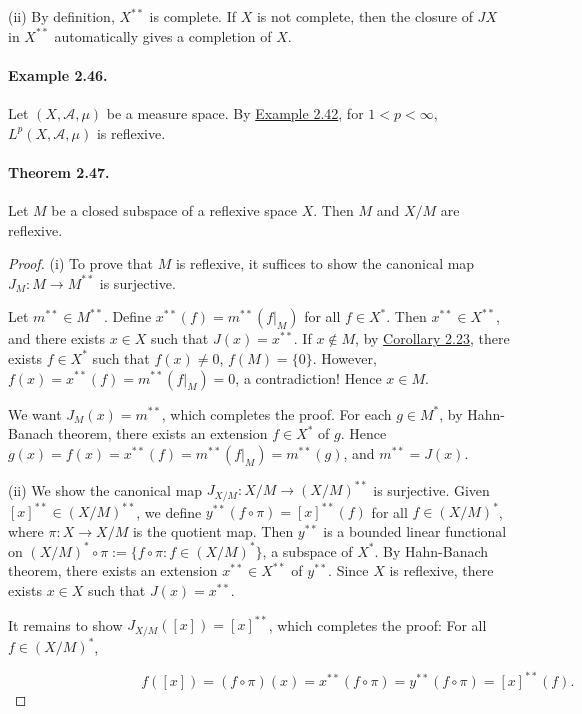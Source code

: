 \documentclass{article}
\begin{document}
(ii) By definition, $X^{**}$ is complete. If $X$ is not complete, then the closure of $JX$ in $X^{**}$ automatically gives a completion of $X$.

\paragraph{Example 2.46.\label{example:2.46}} Let $(X,\mathscr{A},\mu)$ be a measure space. By \hyperref[example:2.42]{Example 2.42}, for $1<p<\infty$, $L^p(X,\mathscr{A},\mu)$ is reflexive.

\paragraph{Theorem 2.47.\label{thm:2.47}} Let $M$ be a closed subspace of a reflexive space $X$. Then $M$ and $X/M$ are reflexive.
\begin{proof}
(i) To prove that $M$ is reflexive, it suffices to show the canonical map $J_M:M\to M^{**}$ is surjective.

Let $m^{**}\in M^{**}$. Define $x^{**}(f) = m^{**}(f|_M)$ for all $f\in X^*$. Then $x^{**}\in X^{**}$, and there exists $x\in X$ such that $J(x)=x^{**}$. If $x\notin M$, by \hyperref[cor:2.23]{Corollary 2.23}, there exists $f\in X^*$ such that $f(x)\neq 0$, $f(M)=\{0\}$. However, $f(x) = x^{**}(f) = m^{**}(f|_M) = 0$, a contradiction! Hence $x\in M$.

We want $J_M(x)=m^{**}$, which completes the proof. For each $g\in M^*$, by Hahn-Banach theorem, there exists an extension $f\in X^*$ of $g$. Hence $g(x) = f(x) = x^{**}(f) =  m^{**}(f|_M) = m^{**}(g)$, and $m^{**}=J(x)$. \vspace{0.1cm}

(ii) We show the canonical map $J_{X/M}:X/M\to(X/M)^{**}$ is surjective. Given $[x]^{**}\in (X/M)^{**}$, we define $y^{**}(f\circ\pi) = [x]^{**}(f)$ for all $f\in(X/M)^*$, where $\pi:X\to X/M$ is the quotient map. Then $y^{**}$ is a bounded linear functional on $(X/M)^*\circ\pi:=\{f\circ\pi:f\in(X/M)^*\}$, a subspace of $X^*$. By Hahn-Banach theorem, there exists an extension $x^{**}\in X^{**}$ of $y^{**}$. Since $X$ is reflexive, there exists $x\in X$ such that $J(x)=x^{**}$.

It remains to show $J_{X/M}([x])=[x]^{**}$, which completes the proof: For all $f\in (X/M)^{*}$, \vspace{0.3cm}

$\hspace{4cm} f([x]) = (f\circ\pi)(x) = x^{**}(f\circ\pi) = y^{**}(f\circ\pi) = [x]^{**}(f).$
\end{proof} 
\end{document}
